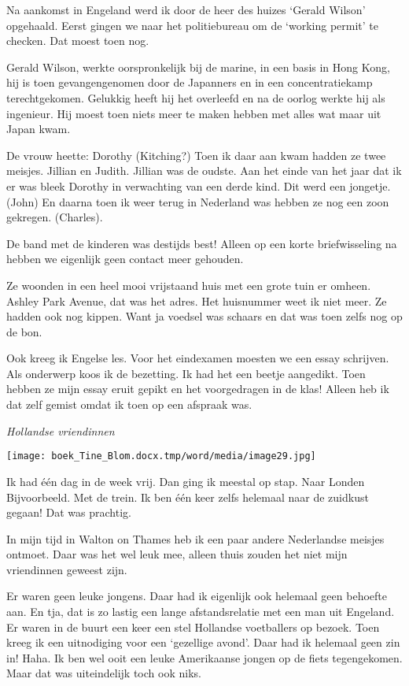 \documentclass{scrbook}
\begin{document}
{ 

Na aankomst in Engeland werd ik door de heer des huizes ‘Gerald Wilson’ opgehaald. Eerst gingen we naar het politiebureau om de ‘working permit’ te checken. Dat moest toen nog.

Gerald Wilson, werkte oorspronkelijk bij de marine, in een basis in Hong Kong, hij is toen gevangengenomen door de Japanners en in een concentratiekamp terechtgekomen. Gelukkig heeft hij het overleefd en na de oorlog werkte hij als ingenieur. Hij moest toen niets meer te maken hebben met alles wat maar uit Japan kwam.

De vrouw heette: Dorothy (Kitching?) Toen ik daar aan kwam hadden ze twee meisjes. Jillian en Judith. Jillian was de oudste. Aan het einde van het jaar dat ik er was bleek Dorothy in verwachting van een derde kind. Dit werd een jongetje. (John) En daarna toen ik weer terug in Nederland was hebben ze nog een zoon gekregen. (Charles).

De band met de kinderen was destijds best! Alleen op een korte briefwisseling na hebben we eigenlijk geen contact meer gehouden. 

Ze woonden in een heel mooi vrijstaand huis met een grote tuin er omheen. Ashley Park Avenue, dat was het adres. Het huisnummer weet ik niet meer. Ze hadden ook nog kippen. Want ja voedsel was schaars en dat was toen zelfs nog op de bon. 

Ook kreeg ik Engelse les. Voor het eindexamen moesten we een essay schrijven. Als onderwerp koos ik de bezetting. Ik had het een beetje aangedikt. Toen hebben ze mijn essay eruit gepikt en het voorgedragen in de klas! Alleen heb ik dat zelf gemist omdat ik toen op een afspraak was. 

\textit{Hollandse vriendinnen }



  \texttt{[image: boek\_Tine\_Blom.docx.tmp/word/media/image29.jpg]}

Ik had \'{e}\'{e}n dag in de week vrij. Dan ging ik meestal op stap. Naar Londen Bijvoorbeeld. Met de trein. Ik ben \'{e}\'{e}n keer zelfs helemaal naar de zuidkust gegaan! Dat was prachtig. 

In mijn tijd in Walton on Thames heb ik een paar andere Nederlandse meisjes ontmoet. Daar was het wel leuk mee, alleen thuis zouden het niet mijn vriendinnen geweest zijn. 

Er waren geen leuke jongens. Daar had ik eigenlijk ook helemaal geen behoefte aan. En tja, dat is zo lastig een lange afstandsrelatie met een man uit Engeland. Er waren in de buurt een keer een stel Hollandse voetballers op bezoek. Toen kreeg ik een uitnodiging voor een ‘gezellige avond’. Daar had ik helemaal geen zin in! Haha. Ik ben wel ooit een leuke Amerikaanse jongen op de fiets tegengekomen. Maar dat was uiteindelijk toch ook niks.

}
\end{document}

